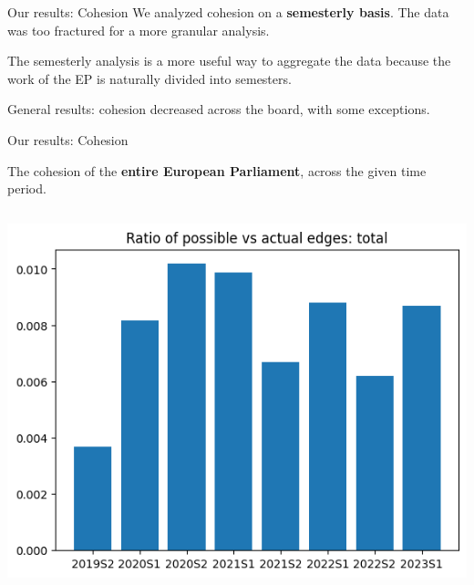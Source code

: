 \documentclass{beamer}
\begin{document}
\begin{frame}{Our results: Cohesion}
	We analyzed cohesion on a \textbf{semesterly basis}. \pause The data was too fractured for a more granular analysis.
	
	\vspace{1cm}
	
	\pause The semesterly analysis is a more useful way to aggregate the data because the work of the EP is naturally divided into semesters.
	
	\vspace{1cm}
	
	\pause General results: cohesion decreased across the board, with some exceptions.
\end{frame}

\begin{frame}{Our results: Cohesion}
	
	The cohesion of the \textbf{entire European Parliament}, across the given time period.
	
	\pause
	
	\vspace{0.5cm}
	
	\begin{columns}
		
		\begin{column}{0.5\textwidth}
			\includegraphics[width=\textwidth]{img/coh_all.png}
		\end{column}
	
	\end{columns}
\end{frame}
\end{document}
